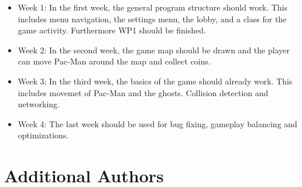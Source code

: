 \documentclass{report}
\begin{document}
\begin{itemize}
	\item Week 1: In the first week, the general program structure should work. This includes menu navigation, the settings menu, the lobby, and a class for the game activity. Furthermore WP1 should be finished. 
	\item Week 2: In the second week, the game map should be drawn and the player can move Pac-Man around the map and collect coins.
	\item Week 3: In the third week, the basics of the game should already work. This includes movemet of Pac-Man and the ghosts. Collision detection and networking.
	\item Week 4: The last week should be used for bug fixing, gameplay balancing and optimizations.
\end{itemize}




\section{Additional Authors}







\end{document}
